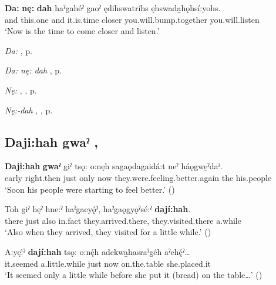 \ea
\label{ex:dpart3}
\gll \textbf{Da:} \textbf{nę:} \textbf{dah} haˀgahéˀ gaoˀ ędihswatríhs ęhswada̱hǫhsí:yohs. \\ 
and this.one and it.is.time closer you.will.bump.together you.will.listen\\
\glt ‘Now is the time to come closer and listen.’
\z

\begin{CayugaRelated}
\item \textit{Da:} , p. \pageref{p:[da:]}\\
\item \textit{Da: nę: dah} , p. \pageref{p:[da: nę: dah]}\\
\item \textit{Nę:} , , p. \pageref{p:[nę:] ‘this, these’}\\
\item \textit{Nę:-dah} , , p. \pageref{p:[nę:-dah] `this’, ‘this way’}
\end{CayugaRelated}


\subsection*{\textbf{Daji:hah gwaˀ} , } \label{p:[daji:hah gwaˀ]}

\ea
\label{ex:dpart6}
\gll \textbf{Daji:hah} \textbf{gwaˀ} giˀ tsǫ: o:nęh sagaǫdagaidá:t neˀ háǫgwe̱ˀdaˀ. \\
early right.then just only now they.were.feeling.better.again the his.people\\
\glt ‘Soon his people were starting to feel better.’ (\cite{carrier_legends_2013})
\z

\ea
\label{ex:dpart7}
\gll Toh giˀ hęˀ hne:ˀ haˀgaeyǫ́ˀ, haˀgaǫgyǫˀsé:ˀ \textbf{dají:hah}.\\
there just also in.fact they.arrived.there, they.visited.there a.while\\
\glt ‘Also when they arrived, they visited for a little while.’ (\cite{henry_de_2005})
\z

\ea
\label{ex:dpart8}
\gll A:yę:́ˀ \textbf{dají:hah} tsǫ: o:nę́h adekwa̱hasraˀgéh aˀehę́ˀ…\\
it.seemed a.little.while just now on.the.table she.placed.it\\
\glt ‘It seemed only a little while before she put it (bread) on the table…’ (\cite{henry_de_2005})
\z

